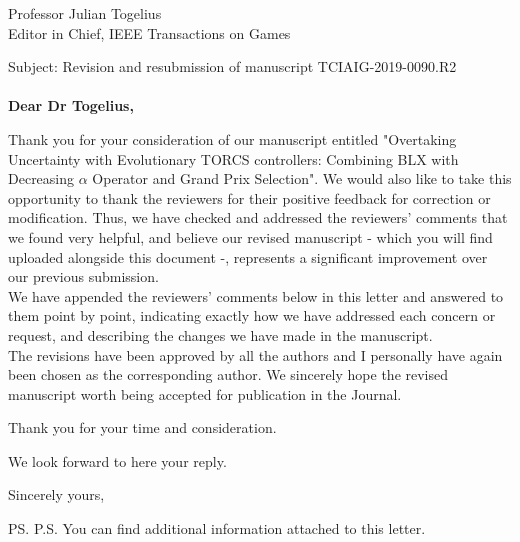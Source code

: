 \documentclass[10pt]{letter} %
\begin{document}

\begin{letter}{Professor Julian Togelius \\ Editor in Chief, IEEE Transactions on Games} %

\opening{Subject: Revision and resubmission of manuscript TCIAIG-2019-0090.R2\\
	\\	
\textbf{Dear Dr Togelius,}}

Thank you for your consideration of our manuscript entitled "Overtaking Uncertainty with Evolutionary TORCS controllers: Combining BLX with Decreasing $\alpha$ Operator and Grand Prix Selection". 
We would also like to take this opportunity to thank the reviewers for their positive feedback for correction or modification. Thus, we have checked and addressed the reviewers' comments that we found very helpful, and believe our revised manuscript - which you will find uploaded alongside this document -, represents a significant improvement over our previous submission. \\


We have appended the reviewers' comments below in this letter and answered to them point by point, indicating exactly how we have addressed each concern or request, and describing the changes we have made in the manuscript.\\
The revisions have been approved by all the authors and I personally have again been chosen as the corresponding author. 
We sincerely hope the revised manuscript worth being accepted for publication in the Journal.

Thank you for your time and consideration.

We look forward to here your reply.

\vspace{2\parskip} %
\closing{Sincerely yours,}
\vspace{2\parskip} %

\ps{P.S. You can find additional information attached to this letter.} %


\end{letter}
\end{document}
